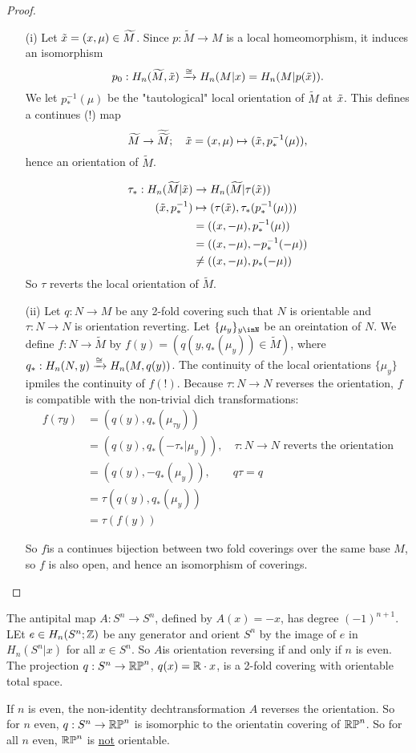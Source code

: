 \documentclass[a4paper,11pt,english]{article}
\def\tM{\widetilde{M}}
\begin{document}
\begin{proof}
\begin{enumerate}
\item[(i)] Let $\tx = (x,\mu) \in \tM$. Since $p: \tM \to M$ is a local
homeomorphism, it induces an isomorphism 
\[ p_0 : H_n(\tM,\tx) \congto H_n(M|x) = H_n(M|p(\tx)). \]
We let $p_*^{-1} (\mu)$ be the "tautological" local orientation of $\tM$ at
$\tilde{x}$. This defines a continues (!) map 
\[ \tM \to \widetilde{\tM}; \quad \tx = (x,\mu) \mapsto (\tx,p_*^{-1}(\mu)), \]
hence an orientation of $\tM$.


\begin{align*}
\tau_* : H_n(\tM | \tx) &\to H_n(\tM| \tau(\tx)) \\
(\tx, p_*^{-1}) &\mapsto (\tau(\tx), \tau_*(p_*^{-1}(\mu))) \\
&= ((x,-\mu), p_*^{-1}(\mu)) \\
&= ( (x,-\mu), -p_*^{-1}(-\mu)) \\
&\ne ((x,-\mu), p_*(-\mu))
\end{align*}
So $\tau$ reverts the local orientation of $\tM$.

\item[(ii)] Let $q:N \to M$ be any 2-fold covering such that $N$ is orientable
and $\tau : N\to N$ is orientation reverting. Let $\{ \mu_y \}_{y\inN}$ be an
oreintation of $N$. We define $f: N \to \tM$ by $f(y) = (q(y, q_*(\mu_y)) \in
\tM)$, where $q_* : H_n(N,y) \xrightarrow{\cong} H_n(M, q(y))$.
The continuity of the local orientations $\{\mu_y\}$ ipmiles the continuity of
$f(!)$. Because $\tau : N\to N$ reverses the orientation, $f$ is compatible with
the non-trivial dich transformations:
\begin{align*}
f(\tau y) &= (q(y), q_*(\mu_{\tau y})) \\
&= (q(y), q_*(-\tau_*|\mu_y)), \quad \tau: N\to N \text{ reverts the
orientation} \\
&= (q(y), -q_*(\mu_y)), \qquad q\tau = q \\
&= \tau(q(y), q_*(\mu_y)) \\
&= \tau(f(y))
\end{align*}

So $f$is a continues bijection between two fold coverings over the same base
$M$, so $f$ is also open, and hence an isomorphism of coverings.
\end{enumerate}
\end{proof}


\begin{exmp}
The antipital map $A : S^n \to S^n$, defined by $A(x) = -x$, has degree
$(-1)^{n+1}$.
LEt $e \in H_n(S^n; \mathbb{Z})$ be any generator and orient $S^n$ by the image of $e$
in $H_n(S^n|x)$ for all $x \in S^n$. 
So $A$is orientation reversing if and only if $n$ is even.
The projection $q:S^n \to \mathbb{RP}^n$, $q(x) = \mathbb{R} \cdot x$, is a 2-fold covering with
orientable total space. 

If $n$ is even, the non-identity dechtransformation $A$ reverses the
orientation. So for $n$ even, $q: S^n \to \mathbb{RP}^n$ is isomorphic to the
orientatin covering of $\mathbb{RP}^n$. So for all $n$ even, $\mathbb{RP}^n$ is
\underline{not} orientable.
\end{exmp}
\end{document}
